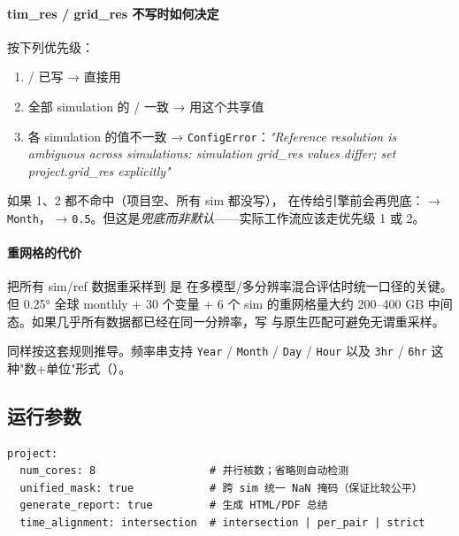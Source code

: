 \paragraph{tim\_res / grid\_res 不写时如何决定}

 按下列优先级：

\begin{enumerate}
  \item {} /  已写 → 直接用
  \item 全部 simulation 的  /  一致 → 用这个共享值
  \item 各 simulation 的值不一致 → \texttt{ConfigError}：\emph{"Reference resolution is ambiguous across simulations: simulation grid\_res values differ; set project.grid\_res explicitly"}
\end{enumerate}

如果 1、2 都不命中（项目空、所有 sim 都没写）， 在传给引擎前会再兜底： → \texttt{Month}， → \texttt{0.5}。但这是\emph{兜底而非默认}——实际工作流应该走优先级 1 或 2。

\paragraph{重网格的代价}

把所有 sim/ref 数据重采样到  是 \openbench{} 在多模型/多分辨率混合评估时统一口径的关键。但 0.25° 全球 monthly + 30 个变量 + 6 个 sim 的重网格量大约 200--400 GB 中间态。如果几乎所有数据都已经在同一分辨率，写  与原生匹配可避免无谓重采样。

\begin{tipBox}
 同样按这套规则推导。频率串支持 \texttt{Year} / \texttt{Month} / \texttt{Day} / \texttt{Hour} 以及 \texttt{3hr} / \texttt{6hr} 这种"数+单位"形式（）。
\end{tipBox}

\subsection{运行参数}

\begin{verbatim}
project:
  num_cores: 8                  # 并行核数；省略则自动检测
  unified_mask: true            # 跨 sim 统一 NaN 掩码（保证比较公平）
  generate_report: true         # 生成 HTML/PDF 总结
  time_alignment: intersection  # intersection | per_pair | strict
\end{verbatim}

